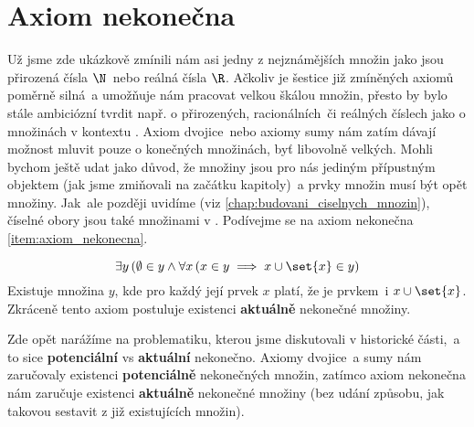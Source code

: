 \section{Axiom nekonečna}\label{sec:axiom_nekonecna}
Už jsme zde ukázkově zmínili nám asi jedny z nejznámějších množin jako jsou přirozená čísla $\N$~nebo reálná čísla $\R$. Ačkoliv je šestice již zmíněných axiomů poměrně silná~a umožňuje nám pracovat velkou škálou množin, přesto by bylo stále ambiciózní tvrdit např. o přirozených, racionálních~či reálných číslech jako o množinách v kontextu \ZF{}. Axiom dvojice~nebo axiomy sumy nám zatím dávají možnost mluvit pouze o konečných množinách, byť libovolně velkých. Mohli bychom ještě udat jako důvod, že množiny jsou pro nás jediným přípustným objektem (jak jsme zmiňovali na začátku kapitoly)~a prvky množin musí být opět množiny. Jak~ale později uvidíme (viz \ref{chap:budovani_ciselnych_mnozin}), číselné obory jsou také množinami v \ZF{}. Podívejme se na axiom nekonečna \ref{item:axiom_nekonecna}.
\medskip

\begin{equation*}
    \exists y\, (\emptyset\in y \land \forall x\,(x\in y\implies x\cup\set{x}\in y)
\end{equation*}
Existuje množina $y$, kde pro každý její prvek $x$ platí, že je prvkem~i $x\cup\set{x}$. Zkráceně tento axiom postuluje existenci \textbf{aktuálně} nekonečné množiny.\par
Zde opět narážíme na problematiku, kterou jsme diskutovali v historické části,~a to sice \textbf{potenciální} vs \textbf{aktuální} nekonečno. Axiomy dvojice~a sumy nám zaručovaly existenci \textbf{potenciálně} nekonečných množin, zatímco axiom nekonečna nám zaručuje existenci \textbf{aktuálně} nekonečné množiny (bez udání způsobu, jak takovou sestavit z již existujících množin).\par